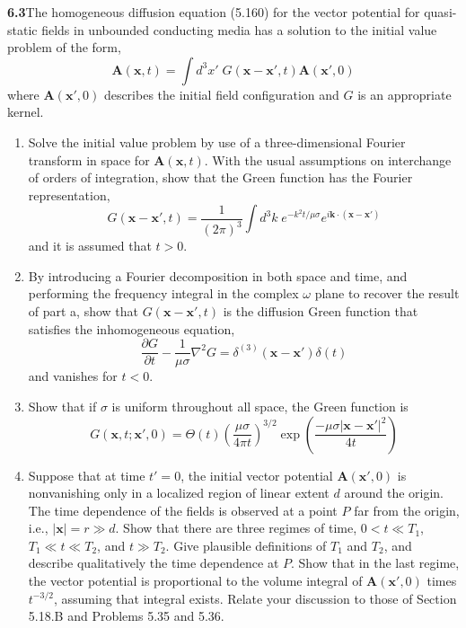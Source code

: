 \par\bigskip
\noindent\textbf{6.3}\quad The homogeneous diffusion equation (5.160) for the vector potential for quasi-static fields in unbounded conducting media has a solution to the initial value problem of the form,
\[
\mathbf{A}(\mathbf{x},t)=\int d^{3}x'\;G(\mathbf{x}-\mathbf{x}',t)\mathbf{A}(\mathbf{x}',0)
\]
where $\mathbf{A}(\mathbf{x}',0)$ describes the initial field configuration and $G$ is an appropriate kernel.
\begin{enumerate}
\item[(a)] Solve the initial value problem by use of a three-dimensional Fourier transform in space for $\mathbf{A}(\mathbf{x},t)$. With the usual assumptions on interchange of orders of integration, show that the Green function has the Fourier representation,
\[
G(\mathbf{x}-\mathbf{x}',t)=\frac{1}{(2\pi)^{3}}\int d^{3}k\;e^{-k^{2}t/\mu\sigma}e^{i\mathbf{k}\cdot(\mathbf{x}-\mathbf{x}')}
\]
and it is assumed that $t>0$.
\item[(b)] By introducing a Fourier decomposition in both space and time, and performing the frequency integral in the complex $\omega$ plane to recover the result of part a, show that $G(\mathbf{x}-\mathbf{x}',t)$ is the diffusion Green function that satisfies the inhomogeneous equation,
\[
\frac{\partial G}{\partial t}-\frac{1}{\mu\sigma}\nabla^{2}G=\delta^{(3)}(\mathbf{x}-\mathbf{x}')\delta(t)
\]
and vanishes for $t<0$.
\item[(c)] Show that if $\sigma$ is uniform throughout all space, the Green function is
\[
G(\mathbf{x},t;\mathbf{x}',0)=\Theta(t)\!\left(\frac{\mu\sigma}{4\pi t}\right)^{3/2}\exp\!\left(\frac{-\mu\sigma|\mathbf{x}-\mathbf{x}'|^{2}}{4t}\right)
\]
\item[(d)] Suppose that at time $t'=0$, the initial vector potential $\mathbf{A}(\mathbf{x}',0)$ is nonvanishing only in a localized region of linear extent $d$ around the origin. The time dependence of the fields is observed at a point $P$ far from the origin, i.e., $|\mathbf{x}|=r\gg d$. Show that there are three regimes of time, $0<t\ll T_{1}$, $T_{1}\ll t\ll T_{2}$, and $t\gg T_{2}$. Give plausible definitions of $T_{1}$ and $T_{2}$, and describe qualitatively the time dependence at $P$. Show that in the last regime, the vector potential is proportional to the volume integral of $\mathbf{A}(\mathbf{x}',0)$ times $t^{-3/2}$, assuming that integral exists. Relate your discussion to those of Section 5.18.B and Problems 5.35 and 5.36.
\end{enumerate}
\solution

